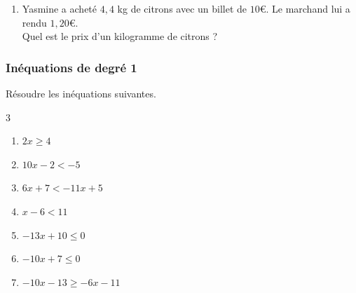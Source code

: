 {\begin{Exercice}
\begin{enumerate}[itemsep=1em]
	\item \begin{minipage}[t]{\linewidth}Yasmine a acheté $4{,}4$ kg de citrons avec un billet de $10$€. Le marchand lui a rendu $1{,}20$€.\\Quel est le prix d'un kilogramme de citrons ?\end{minipage}
\end{enumerate}
\end{Exercice}



\subsubsection*{Inéquations de degré 1}

\begin{Exercice}
Résoudre les inéquations suivantes.
\leavevmode\vspace{-\baselineskip}
\begin{multicols}{3}
\begin{enumerate}[itemsep=1.5em]
	\item \begin{minipage}[t]{\linewidth}$2x\geqslant4$\\\end{minipage}
	\item \begin{minipage}[t]{\linewidth}$10x-2<-5$\\\end{minipage}
	\item \begin{minipage}[t]{\linewidth}$6x+7< -11x+5$\\\end{minipage}
	\item \begin{minipage}[t]{\linewidth}$x-6<11$\\\end{minipage}
	\item \begin{minipage}[t]{\linewidth}$-13x+10\leqslant0$\\\end{minipage}
	\item \begin{minipage}[t]{\linewidth}$-10x+7\leqslant0$\\\end{minipage}
	\item \begin{minipage}[t]{\linewidth}$-10x-13\geqslant -6x-11$\\\end{minipage}

\end{enumerate}
\end{multicols}
\end{Exercice}}
